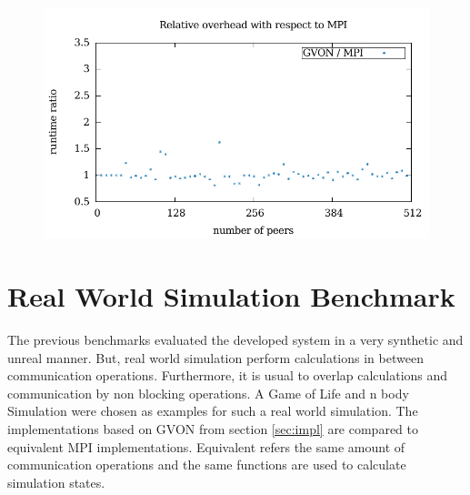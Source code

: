 \begin{figure}[H]
\begin{minipage}[t]{0.5\textwidth}
    \includegraphics[width=\textwidth]{plots/50_reduce_network_overhead_gvon_laser}
  \end{minipage}%
  \caption{ }
  \label{fig:reduce_laser}
\end{figure}


\section{Real World Simulation Benchmark}
\label{sec:eval:real}
The previous benchmarks evaluated the developed system in a very
synthetic and unreal manner. But, real world simulation perform
calculations in between communication operations. Furthermore, it is
usual to overlap calculations and communication by non blocking
operations. A Game of Life and n body Simulation were chosen as
examples for such a real world simulation. The implementations based
on GVON from section \ref{sec:impl} are compared to equivalent MPI
implementations.  Equivalent refers the same amount of communication
operations and the same functions are used to calculate simulation
states.


